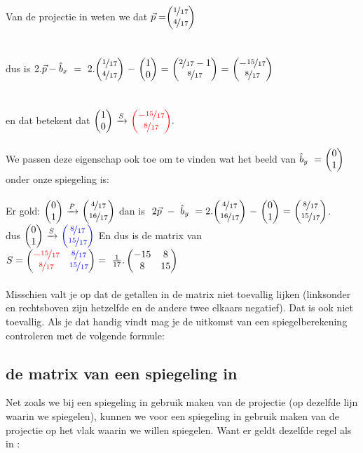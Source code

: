 Van de projectie in \RT weten we dat 
$ \vec{p} = \vectwee{ \nicefrac{1}{17} } { \nicefrac{4}{17} } \  $ \\ \\ \\dus is 
$ 2.\vec{p} -  \hat{b}_x
\  =  \   2.  \vectwee{ \nicefrac{1}{17} } { \nicefrac{4}{17} } \ - \ \vectwee{1}{0} 
\ = \    \vectwee{ \nicefrac{2}{17} -1 } {\nicefrac{8}{17}} 
\ = \    \vectwee{ -\nicefrac{15}{17} } {\nicefrac{8}{17}} 
$ \\ \\ \\
en dat betekent dat   $ \vectwee{1}{0}  \  \xrightarrow{S}   
\  \vectwee[red]{ -\nicefrac{15}{17} } {\nicefrac{8}{17}} . $ \\ \\
We passen deze eigenschap ook toe om te vinden wat het beeld van  $  \hat{b}_y\ = \ \vectwee{0}{1} $ onder onze spiegeling is:\\ \\
Er gold:  $ \vectwee{0}{1}   \  \xrightarrow{P}  \ 
\vectwee{\nicefrac{4} {17} } {\nicefrac {16} {17}} $
\qquad  dan is $  \  2\vec{p} \ - \  \hat{b}_y \ 
= 2 .\vectwee{ \nicefrac {4} {17} } { \nicefrac {16} {17}} \ - \ \vectwee{0}{1}  \ 
= \  \vectwee{\nicefrac{8}{17} } {\nicefrac{15}{17}}  $. \\

\quad dus  $ \vectwee{0}{1}   \  \xrightarrow{S}  \
\vectwee[blue]{\nicefrac{8}{17} } {\nicefrac{15}{17} } $ 
\quad \quad En dus is de matrix van 
$ S = \begin{pmatrix}  
	{\color{red} - \nicefrac{15}{17}} & { \color{blue}\nicefrac{8}{17}}  \\  {\color{red} \nicefrac{8}{17} } & { \color{blue} \nicefrac{15}{17} }  \end{pmatrix} 
 = \ \frac{1}{17} .  \begin{pmatrix} -15&8 \\ 8&15 \end{pmatrix} $\\ \\
Misschien valt je op dat de getallen in de matrix niet toevallig lijken (linksonder en rechtsboven zijn hetzelfde en de andere twee elkaars negatief). Dat is ook niet toevallig. Als je dat handig vindt mag je de uitkomst van een spiegelberekening controleren met de volgende formule:\\


\subsection{de matrix van een spiegeling in \RD}
Net zoals we bij een spiegeling in \RT gebruik maken van de projectie (op dezelfde lijn waarin we spiegelen), kunnen we voor een spiegeling in \RD gebruik maken van de projectie op het vlak waarin we willen spiegelen. Want er geldt dezelfde regel als in \RT:\\ \\

